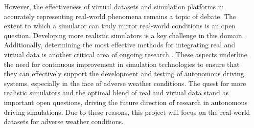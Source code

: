 \documentclass[report.tex]{subfiles}
\begin{document}
    However, the effectiveness of virtual datasets and simulation platforms in accurately representing real-world phenomena remains a topic of debate. The extent to which a simulator can truly mirror real-world conditions is an open question. Developing more realistic simulators is a key challenge in this domain. Additionally, determining the most effective methods for integrating real and virtual data is another critical area of ongoing research \cite{feng2020deep}. These aspects underline the need for continuous improvement in simulation technologies to ensure that they can effectively support the development and testing of autonomous driving systems, especially in the face of adverse weather conditions. The quest for more realistic simulators and the optimal blend of real and virtual data stand as important open questions, driving the future direction of research in autonomous driving simulations. Due to these reasons, this project will focus on the real-world datasets for adverse weather conditions.
    
\end{document}
